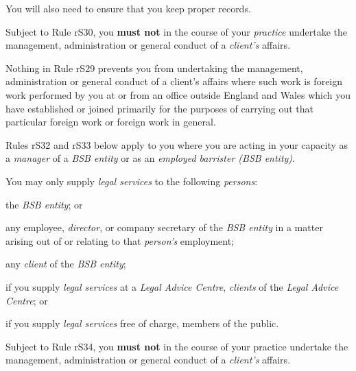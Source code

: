 You will also need to ensure that you keep proper records.




Subject to Rule rS30, you \textcolor{myred}{\textbf{must not }}in the course of your \emph{practice}
undertake the management, administration or general conduct of a
\emph{client's} affairs.


Nothing in Rule rS29 prevents you from undertaking the management,
administration or general conduct of a client's affairs where such work
is foreign work performed by you at or from an office outside England
and Wales which you have established or joined primarily for the
purposes of carrying out that particular foreign work or foreign work in
general.




Rules rS32 and rS33 below apply to you where you are acting in your
capacity as a \emph{manager} of a \emph{BSB entity} or as an
\emph{employed barrister (BSB entity)}.


You may only supply \emph{legal services} to the following
\emph{persons}:\nl\item the \emph{BSB entity}; or
\item any employee, \emph{director}, or company secretary of the \emph{BSB
entity} in a matter arising out of or relating to that \emph{person's}
employment;
\item any \emph{client} of the \emph{BSB entity};
\item if you supply \emph{legal services} at a \emph{Legal Advice Centre},
\emph{clients} of the \emph{Legal Advice Centre}; or~
\item if you supply \emph{legal services} free of charge, members of the
public.\ln


Subject to Rule rS34, you \textcolor{myred}{\textbf{must not }}in the course of your practice
undertake the management, administration or general conduct of a
\emph{client's} affairs.


